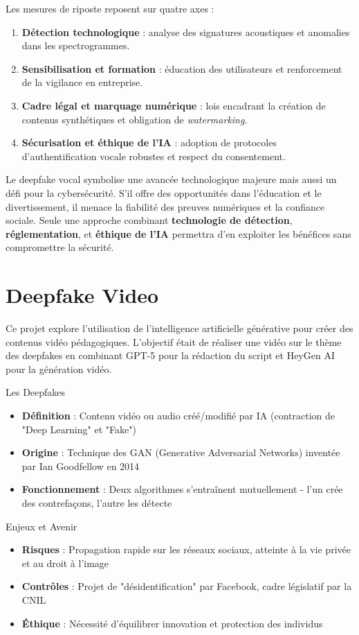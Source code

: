 \documentclass[12pt, a4em]{article}
\begin{document}
	Les mesures de riposte reposent sur quatre axes :
	\begin{enumerate}
		\item \textbf{Détection technologique} : analyse des signatures acoustiques et anomalies dans les spectrogrammes.
		\item \textbf{Sensibilisation et formation} : éducation des utilisateurs et renforcement de la vigilance en entreprise.
		\item \textbf{Cadre légal et marquage numérique} : lois encadrant la création de contenus synthétiques et obligation de \textit{watermarking}.
		\item \textbf{Sécurisation et éthique de l’IA} : adoption de protocoles d’authentification vocale robustes et respect du consentement.
	\end{enumerate}
	
	Le deepfake vocal symbolise une avancée technologique majeure mais aussi un défi pour la cybersécurité. 
	S’il offre des opportunités dans l’éducation et le divertissement, il menace la fiabilité des preuves numériques et la confiance sociale. 
	Seule une approche combinant \textbf{technologie de détection}, \textbf{réglementation}, et \textbf{éthique de l’IA} permettra d’en exploiter les bénéfices sans compromettre la sécurité.
	
	\section{Deepfake Video}
	
	Ce projet explore l'utilisation de l'intelligence artificielle générative pour créer des contenus vidéo pédagogiques. L'objectif était de réaliser une vidéo sur le thème des deepfakes en combinant GPT-5 pour la rédaction du script et HeyGen AI pour la génération vidéo.
	
	Les Deepfakes
	\begin{itemize}
		\item \textbf{Définition} : Contenu vidéo ou audio créé/modifié par IA (contraction de "Deep Learning" et "Fake")
		\item \textbf{Origine} : Technique des GAN (Generative Adversarial Networks) inventée par Ian Goodfellow en 2014
		\item \textbf{Fonctionnement} : Deux algorithmes s'entraînent mutuellement - l'un crée des contrefaçons, l'autre les détecte
	\end{itemize}
	
	Enjeux et Avenir
	\begin{itemize}
		\item \textbf{Risques} : Propagation rapide sur les réseaux sociaux, atteinte à la vie privée et au droit à l'image
		\item \textbf{Contrôles} : Projet de "désidentification" par Facebook, cadre législatif par la CNIL
		\item \textbf{Éthique} : Nécessité d'équilibrer innovation et protection des individus
	\end{itemize}
	
\end{document}
